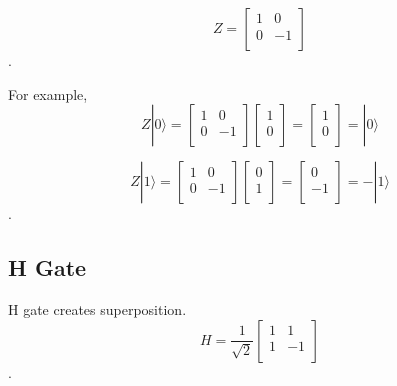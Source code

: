 \begin{equation}
 Z = \begin{bmatrix}
1 & 0 \\
0 & -1 \\
\end{bmatrix}
\end{equation}.

For example,
\begin{equation}
 Z|0\rangle = \begin{bmatrix}
1 & 0 \\
0 & -1 \\
\end{bmatrix} 
\left[
\begin{array}{c}
1 \\
0 \\
\end{array}
\right]
= \left[
\begin{array}{c}
1 \\
0 \\
\end{array}
\right]
= |0\rangle
\end{equation}

\begin{equation}
Z|1\rangle = \begin{bmatrix}
1 & 0 \\
0 & -1 \\
\end{bmatrix} 
\left[
\begin{array}{c}
0 \\
1  \\
\end{array}
\right]
= \left[
\begin{array}{c}
0 \\
-1 \\
\end{array}
\right]
= -|1\rangle
\end{equation}.

\subsection{H Gate}
H gate creates superposition.
\begin{equation}
 H = \frac{1}{\sqrt{2}}\begin{bmatrix}
1 & 1\\
1 & -1 \\
\end{bmatrix}
\end{equation}.

